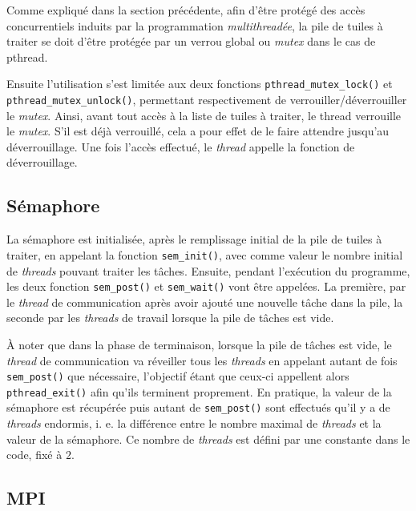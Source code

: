 Comme expliqué dans la section précédente, afin d'être protégé des accès concurrentiels induits par la programmation \emph{multithreadée}, la pile de tuiles à traiter se doit d'être protégée par un verrou global ou \emph{mutex} dans le cas de \textsf{pthread}.

Ensuite l'utilisation s'est limitée aux deux fonctions \texttt{pthread\_mutex\_lock()} et \texttt{pthread\_mutex\_unlock()}, permettant respectivement de verrouiller/déverrouiller le \emph{mutex}. Ainsi, avant tout accès à la liste de tuiles à traiter, le thread verrouille le \emph{mutex}. S'il est déjà verrouillé, cela a pour effet de le faire attendre jusqu'au déverrouillage. Une fois l'accès effectué, le \emph{thread} appelle la fonction de déverrouillage.

\subsection{Sémaphore}

La sémaphore est initialisée, après le remplissage initial de la pile de tuiles à traiter, en appelant la fonction \texttt{sem\_init()}, avec comme valeur le nombre initial de \emph{threads} pouvant traiter les tâches. Ensuite, pendant l'exécution du programme, les deux fonction \texttt{sem\_post()} et \texttt{sem\_wait()} vont être appelées. La première, par le \emph{thread} de communication après avoir ajouté une nouvelle tâche dans la pile, la seconde par les \emph{threads} de travail lorsque la pile de tâches est vide.

À noter que dans la phase de terminaison, lorsque la pile de tâches est vide, le \emph{thread} de communication va réveiller tous les \emph{threads} en appelant autant de fois \texttt{sem\_post()} que nécessaire, l'objectif étant que ceux-ci appellent alors \texttt{pthread\_exit()} afin qu'ils terminent proprement. En pratique, la valeur de la sémaphore est récupérée puis autant de \texttt{sem\_post()} sont effectués qu'il y a de \emph{threads} endormis, i. e. la différence entre le nombre maximal de \emph{threads} et la valeur de la sémaphore. Ce nombre de \emph{threads} est défini par une constante dans le code, fixé à $2$.

\subsection{MPI}

